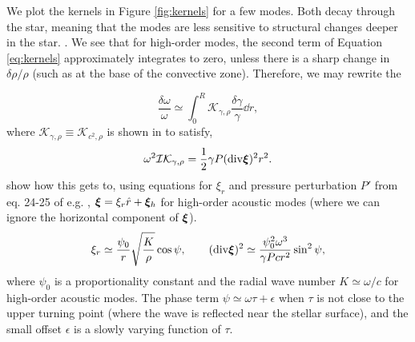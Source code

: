 We plot the kernels in Figure \ref{fig:kernels} for a few modes. Both decay through the star, meaning that the modes are less sensitive to structural changes deeper in the star. . We see that for high-order modes, the second term of Equation \ref{eq:kernels} approximately integrates to zero, unless there is a sharp change in \(\delta\rho/\rho\) (such as at the base of the convective zone). Therefore, we may rewrite the 

%
\begin{equation}
    \frac{\delta\omega}{\omega} \simeq \int_0^R \mathcal{K}_{\gamma,\rho} \frac{\delta\gamma}{\gamma} \dd r,\label{eq:delta-omega}
\end{equation}
%
where \(\mathcal{K}_{\gamma,\rho} \equiv \mathcal{K}_{c^2,\rho}\) is shown in \citet{Gough1993} to satisfy,
%
\begin{equation}
    \omega^2 \mathcal{I}\mathcal{K}_{\gamma,\rho} = \frac12 \gamma P (\mathrm{div} \bm{\xi})^2 r^2.\label{eq:gamma-kernel}
\end{equation}
%
show how this gets to, using equations for \(\xi_r\) and pressure perturbation \(P'\) from eq. 24-25 of e.g. \citet{Shibahashi1979}, \(\bm{\xi} = \xi_r \hat{r} + \bm{\xi}_h\) for high-order acoustic modes (where we can ignore the horizontal component of \(\bm{\xi}\)).
%
\begin{equation}
    \xi_r \simeq \frac{\psi_0}{r}\sqrt{\frac{K}{\rho}} \cos\psi,\qquad
    (\mathrm{div} \bm{\xi})^2 \simeq \frac{\psi_0^2 \omega^3}{\gamma P c r^2} \sin^2\psi, \label{eq:xi-approx}
\end{equation}
%
where \(\psi_0\) is a proportionality constant and the radial wave number \(K \simeq \omega / c\) for high-order acoustic modes. The phase term \(\psi \simeq \omega \tau + \epsilon\) when \(\tau\) is not close to the upper turning point (where the wave is reflected near the stellar surface), and the small offset \(\epsilon\) is a slowly varying function of \(\tau\).

